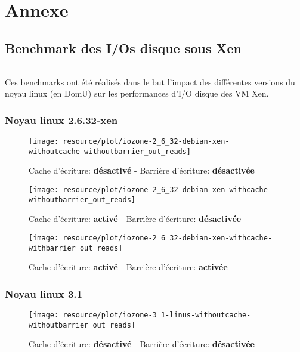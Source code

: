 \part{Annexe}
\chapter{Benchmark des I/Os disque sous Xen}

\paragraph*{}
Ces benchmarks ont été réalisés dans le but l'impact des différentes versions du noyau linux
(en DomU) sur les performances d'I/O disque des VM Xen.


\section{Noyau linux 2.6.32-xen}

\begin{figure}[H]
	\centering
	\texttt{[image: resource/plot/iozone-2\_6\_32-debian-xen-withoutcache-withoutbarrier\_out\_reads]}
	\caption{Cache d'écriture: \textbf{désactivé}   -   Barrière d'écriture: \textbf{désactivée}}
\end{figure}

\begin{figure}[H]
	\centering
	\texttt{[image: resource/plot/iozone-2\_6\_32-debian-xen-withcache-withoutbarrier\_out\_reads]}
	\caption{Cache d'écriture: \textbf{activé}   -   Barrière d'écriture: \textbf{désactivée}}
\end{figure}

\begin{figure}[H]
	\centering
	\texttt{[image: resource/plot/iozone-2\_6\_32-debian-xen-withcache-withbarrier\_out\_reads]}
	\caption{Cache d'écriture: \textbf{activé}   -   Barrière d'écriture: \textbf{activée}}
\end{figure}


\section{Noyau linux 3.1}

\begin{figure}[H]
	\centering
	\texttt{[image: resource/plot/iozone-3\_1-linus-withoutcache-withoutbarrier\_out\_reads]}
	\caption{Cache d'écriture: \textbf{désactivé}   -   Barrière d'écriture: \textbf{désactivée}}
\end{figure}

